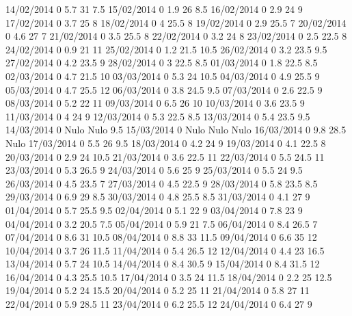 14/02/2014  0      5.7    31     7.5 
15/02/2014  0      1.9    26     8.5 
16/02/2014  0      2.9    24     9 
17/02/2014  0      3.7    25     8 
18/02/2014  0      4      25.5   8 
19/02/2014  0      2.9    25.5   7 
20/02/2014  0      4.6    27     7 
21/02/2014  0      3.5    25.5   8 
22/02/2014  0      3.2    24     8 
23/02/2014  0      2.5    22.5   8 
24/02/2014  0      0.9    21     11 
25/02/2014  0      1.2    21.5   10.5 
26/02/2014  0      3.2    23.5   9.5 
27/02/2014  0      4.2    23.5   9 
28/02/2014  0      3      22.5   8.5 
01/03/2014  0      1.8    22.5   8.5 
02/03/2014  0      4.7    21.5   10 
03/03/2014  0      5.3    24     10.5 
04/03/2014  0      4.9    25.5   9 
05/03/2014  0      4.7    25.5   12 
06/03/2014  0      3.8    24.5   9.5 
07/03/2014  0      2.6    22.5   9 
08/03/2014  0      5.2    22     11 
09/03/2014  0      6.5    26     10 
10/03/2014  0      3.6    23.5   9 
11/03/2014  0      4      24     9 
12/03/2014  0      5.3    22.5   8.5 
13/03/2014  0      5.4    23.5   9.5 
14/03/2014  0     Nulo   Nulo    9.5 
15/03/2014  0     Nulo   Nulo   Nulo
16/03/2014  0      9.8    28.5  Nulo
17/03/2014  0      5.5    26     9.5 
18/03/2014  0      4.2    24     9 
19/03/2014  0      4.1    22.5   8 
20/03/2014  0      2.9    24     10.5 
21/03/2014  0      3.6    22.5   11 
22/03/2014  0      5.5    24.5   11 
23/03/2014  0      5.3    26.5   9 
24/03/2014  0      5.6    25     9 
25/03/2014  0      5.5    24     9.5 
26/03/2014  0      4.5    23.5   7 
27/03/2014  0      4.5    22.5   9 
28/03/2014  0      5.8    23.5   8.5 
29/03/2014  0      6.9    29     8.5 
30/03/2014  0      4.8    25.5   8.5 
31/03/2014  0      4.1    27     9 
01/04/2014  0      5.7    25.5   9.5 
02/04/2014  0      5.1    22     9 
03/04/2014  0      7.8    23     9 
04/04/2014  0      3.2    20.5   7.5 
05/04/2014  0      5.9    21     7.5 
06/04/2014  0      8.4    26.5   7 
07/04/2014  0      8.6    31     10.5 
08/04/2014  0      8.8    33     11.5 
09/04/2014  0      6.6    35     12 
10/04/2014  0      3.7    26     11.5 
11/04/2014  0      5.4    26.5   12 
12/04/2014  0      4.4    23     16.5 
13/04/2014  0      5.7    24     10.5 
14/04/2014  0      8.4    30.5   9 
15/04/2014  0      8.4    31.5   12 
16/04/2014  0      4.3    25.5   10.5 
17/04/2014  0      3.5    24     11.5 
18/04/2014  0      2.2    25     12.5 
19/04/2014  0      5.2    24     15.5 
20/04/2014  0      5.2    25     11 
21/04/2014  0      5.8    27     11 
22/04/2014  0      5.9    28.5   11 
23/04/2014  0      6.2    25.5   12 
24/04/2014  0      6.4    27     9 
